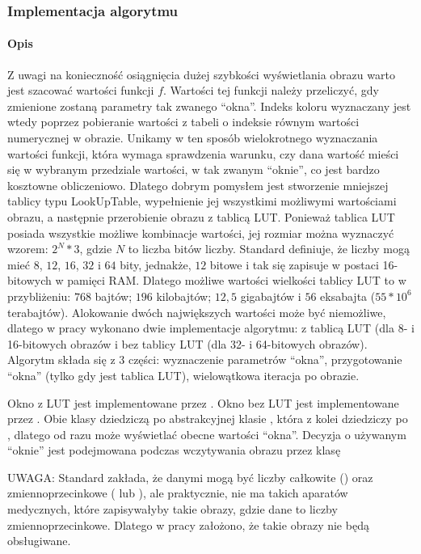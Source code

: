 \subsubsection{Implementacja algorytmu}

\paragraph{Opis}
\par
Z uwagi na konieczność osiągnięcia dużej szybkości wyświetlania obrazu warto jest szacować wartości funkcji $f$.
Wartości tej funkcji należy przeliczyć, gdy zmienione zostaną parametry tak zwanego \enquote{okna}.
Indeks koloru wyznaczany jest wtedy poprzez pobieranie wartości z tabeli o indeksie równym wartości numerycznej w obrazie.
Unikamy w ten sposób wielokrotnego wyznaczania wartości funkcji, która wymaga sprawdzenia warunku, czy dana wartość mieści się w wybranym przedziale wartości, w tak zwanym \enquote{oknie}, co jest bardzo kosztowne obliczeniowo.
Dlatego dobrym pomysłem jest stworzenie mniejszej tablicy typu LookUpTable, wypełnienie jej wszystkimi możliwymi wartościami obrazu, a następnie przerobienie obrazu z tablicą LUT.
Ponieważ tablica LUT posiada wszystkie możliwe kombinacje wartości, jej rozmiar można wyznaczyć wzorem: $2^N*3$, gdzie $N$ to liczba bitów liczby.
Standard \DICOM definiuje, że liczby mogą mieć $8$, $12$, $16$, $32$ i $64$ bity, jednakże, $12$ bitowe i tak się zapisuje w postaci 16-bitowych w pamięci RAM.
Dlatego możliwe wartości wielkości tablicy LUT to w przybliżeniu: $768$ bajtów; $196$ kilobajtów; $12,5$ gigabajtów i $56$ eksabajta ($55*10^{6}$ terabajtów).
Alokowanie dwóch największych wartości może być niemożliwe, dlatego w pracy wykonano dwie implementacje algorytmu: z tablicą LUT (dla 8- i 16-bitowych obrazów i bez tablicy LUT (dla 32- i 64-bitowych obrazów).
Algorytm składa się z 3 części: wyznaczenie parametrów \enquote{okna}, przygotowanie \enquote{okna} (tylko gdy jest tablica LUT), wielowątkowa iteracja po obrazie.
\par
Okno z LUT jest implementowane przez .
Okno bez LUT jest implementowane przez .
Obie klasy dziedziczą po abstrakcyjnej klasie , która z kolei dziedziczy po , dlatego od razu może wyświetlać obecne wartości \enquote{okna}.
Decyzja o używanym \enquote{oknie} jest podejmowana podczas wczytywania obrazu przez klasę 
\par
UWAGA: Standard \DICOM zakłada, że danymi mogą być liczby całkowite () oraz zmiennoprzecinkowe ( lub ), ale praktycznie, nie ma takich aparatów medycznych, które zapisywałyby takie obrazy, gdzie dane to liczby zmiennoprzecinkowe.
Dlatego w pracy założono, że takie obrazy nie będą obsługiwane.

